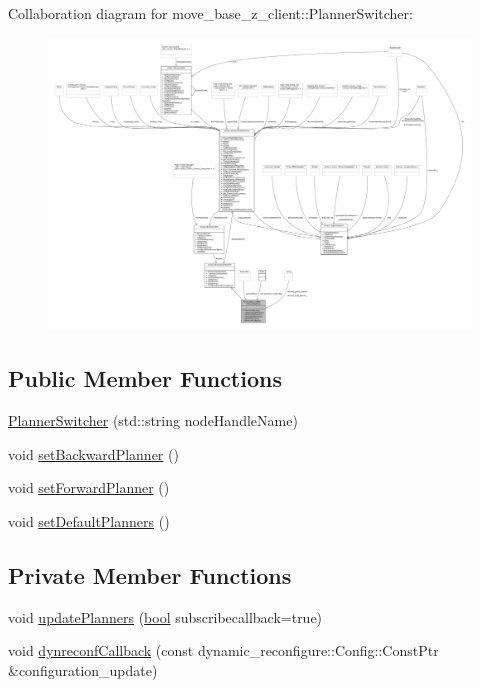 Collaboration diagram for move\+\_\+base\+\_\+z\+\_\+client\+:\+:Planner\+Switcher\+:
\nopagebreak
\begin{figure}[H]
\begin{center}
\leavevmode
\includegraphics[width=350pt]{classmove__base__z__client_1_1PlannerSwitcher__coll__graph}
\end{center}
\end{figure}
\subsection*{Public Member Functions}
\begin{DoxyCompactItemize}
\item 
\hyperlink{classmove__base__z__client_1_1PlannerSwitcher_a6f07fd7796bc3c9abf2c219ec33d27d3}{Planner\+Switcher} (std\+::string node\+Handle\+Name)
\item 
void \hyperlink{classmove__base__z__client_1_1PlannerSwitcher_a7688616d66fbfe6486c0cbe77e688114}{set\+Backward\+Planner} ()
\item 
void \hyperlink{classmove__base__z__client_1_1PlannerSwitcher_a4797022f304538949a2019b351ec47a8}{set\+Forward\+Planner} ()
\item 
void \hyperlink{classmove__base__z__client_1_1PlannerSwitcher_aa31306368ab2a5145c024c0c1a580547}{set\+Default\+Planners} ()
\end{DoxyCompactItemize}
\subsection*{Private Member Functions}
\begin{DoxyCompactItemize}
\item 
void \hyperlink{classmove__base__z__client_1_1PlannerSwitcher_a189ac8c027169a111c7d8e14d864752f}{update\+Planners} (\hyperlink{classbool}{bool} subscribecallback=true)
\item 
void \hyperlink{classmove__base__z__client_1_1PlannerSwitcher_a7eacfedc6b6ea404ee8fab062d62a911}{dynreconf\+Callback} (const dynamic\+\_\+reconfigure\+::\+Config\+::\+Const\+Ptr \&configuration\+\_\+update)
\end{DoxyCompactItemize}
